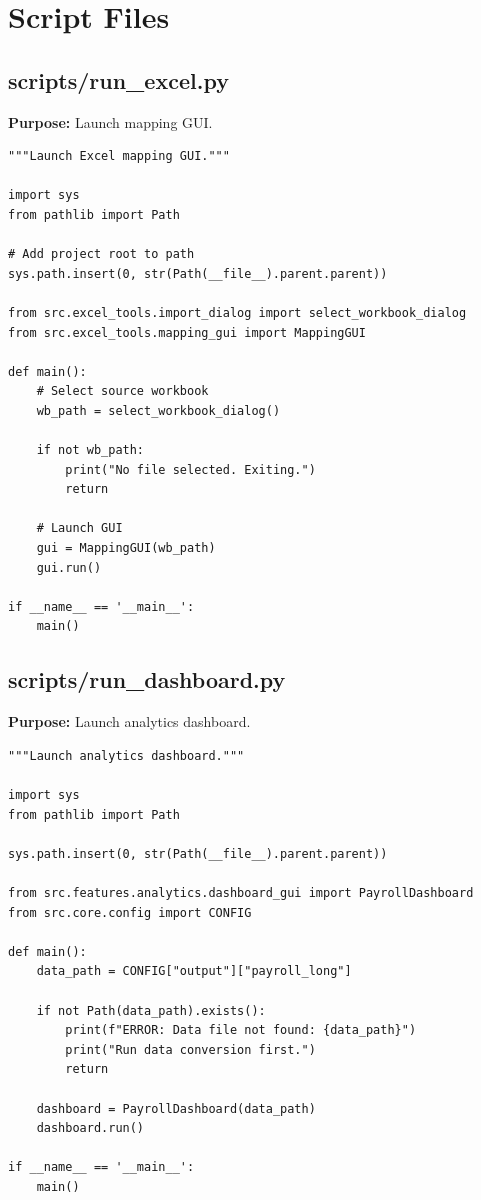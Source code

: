 \section{Script Files}

\subsection{scripts/run\_excel.py}

\textbf{Purpose:} Launch mapping GUI.

\begin{lstlisting}[style=pythonstyle]
"""Launch Excel mapping GUI."""

import sys
from pathlib import Path

# Add project root to path
sys.path.insert(0, str(Path(__file__).parent.parent))

from src.excel_tools.import_dialog import select_workbook_dialog
from src.excel_tools.mapping_gui import MappingGUI

def main():
    # Select source workbook
    wb_path = select_workbook_dialog()
    
    if not wb_path:
        print("No file selected. Exiting.")
        return
    
    # Launch GUI
    gui = MappingGUI(wb_path)
    gui.run()

if __name__ == '__main__':
    main()
\end{lstlisting}

\subsection{scripts/run\_dashboard.py}

\textbf{Purpose:} Launch analytics dashboard.

\begin{lstlisting}[style=pythonstyle]
"""Launch analytics dashboard."""

import sys
from pathlib import Path

sys.path.insert(0, str(Path(__file__).parent.parent))

from src.features.analytics.dashboard_gui import PayrollDashboard
from src.core.config import CONFIG

def main():
    data_path = CONFIG["output"]["payroll_long"]
    
    if not Path(data_path).exists():
        print(f"ERROR: Data file not found: {data_path}")
        print("Run data conversion first.")
        return
    
    dashboard = PayrollDashboard(data_path)
    dashboard.run()

if __name__ == '__main__':
    main()
\end{lstlisting}

